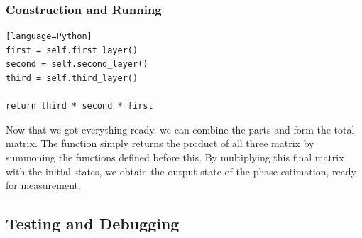 \documentclass{article}
\begin{document}
\subsubsection{Construction and Running}

\begin{file}
\begin{lstlisting}[linewidth=14cm][language=Python]
first = self.first_layer()
second = self.second_layer()
third = self.third_layer()

return third * second * first
\end{lstlisting}
\end{file}
Now that we got everything ready, we can combine the parts and form the total matrix. The function simply returns the product of all three matrix by summoning the functions defined before this. By multiplying this final matrix with the initial states, we obtain the output state of the phase estimation, ready for measurement.

\pagebreak


\subsection{\label{testing}Testing and Debugging}
\end{document}

